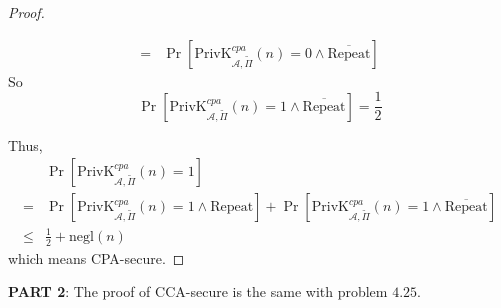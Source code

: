 \documentclass[12pt]{article}
\newcommand{\privk}{\text{PrivK}}
\newcommand{\negl}{\text{negl}}
\newcommand{\Repeat}{\text{Repeat}}
\newcommand{\A}{\mathcal{A}}
\newenvironment{problem}[2][Problem]{\begin{trivlist}
\item[\hskip \labelsep {\bfseries #1}\hskip \labelsep {\bfseries #2.}]}{\end{trivlist}}
\begin{document}
\begin{problem}{3.18}
\begin{proof}
\begin{enumerate}
\begin{align*}
        =&\Pr[\privk_{\A,\widetilde{\Pi}}^{cpa}(n)=0\land\overline{\Repeat}]
    \end{align*}
    So \[\Pr[\privk_{\A,\widetilde{\Pi}}^{cpa}(n)=1\land\overline{\Repeat}]=\frac12\]
\end{enumerate}
Thus,
\begin{align*}
    &\Pr[\privk_{\A,\widetilde{\Pi}}^{cpa}(n)=1]\\
    =&\Pr[\privk_{\A,\widetilde{\Pi}}^{cpa}(n)=1\land\Repeat]+\Pr[\privk_{\A,\widetilde{\Pi}}^{cpa}(n)=1\land\overline{\Repeat}]\\
    \le&\frac12+\negl(n)
\end{align*}
which means CPA-secure.\par
\end{proof}
\textbf{PART 2}: The proof of CCA-secure is the same with problem $4.25$.
\end{problem}
\end{document}
